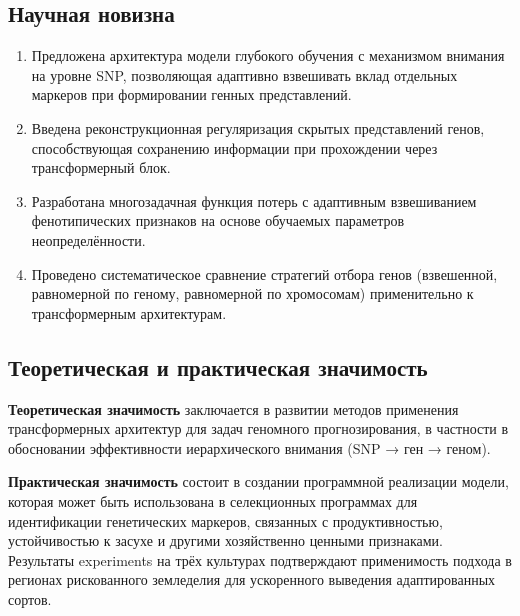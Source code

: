 \subsection*{Научная новизна}
\begin{enumerate}
	\item Предложена архитектура модели глубокого обучения с механизмом 
	внимания на уровне SNP, позволяющая адаптивно взвешивать вклад 
	отдельных маркеров при формировании генных представлений.
	\item Введена реконструкционная регуляризация скрытых представлений 
	генов, способствующая сохранению информации при прохождении через 
	трансформерный блок.
	\item Разработана многозадачная функция потерь с адаптивным 
	взвешиванием фенотипических признаков на основе обучаемых параметров 
	неопределённости.
	\item Проведено систематическое сравнение стратегий отбора генов 
	(взвешенной, равномерной по геному, равномерной по хромосомам) 
	применительно к трансформерным архитектурам.
\end{enumerate}

\subsection*{Теоретическая и практическая значимость}
\textbf{Теоретическая значимость} заключается в развитии методов 
применения трансформерных архитектур для задач геномного прогнозирования, 
в частности в обосновании эффективности иерархического внимания 
(SNP → ген → геном).

\textbf{Практическая значимость} состоит в создании программной 
реализации модели, которая может быть использована в селекционных 
программах для идентификации генетических маркеров, связанных с 
продуктивностью, устойчивостью к засухе и другими хозяйственно 
ценными признаками. Результаты experiments на трёх культурах 
подтверждают применимость подхода в регионах рискованного земледелия 
для ускоренного выведения адаптированных сортов.


